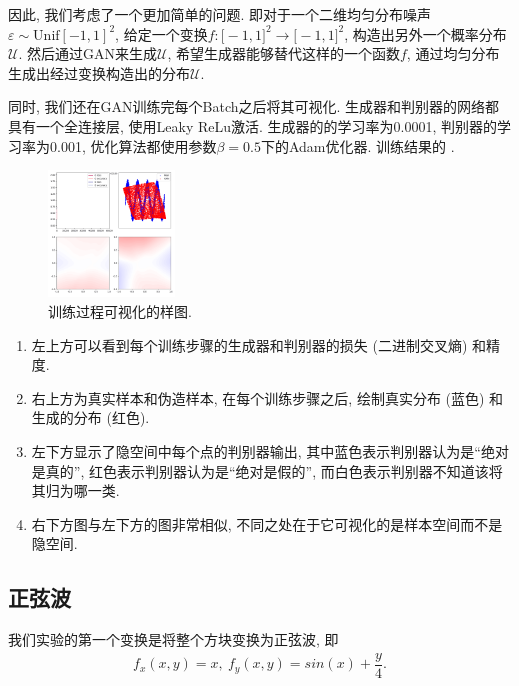 \documentclass[lang=cn,11pt]{elegantpaper}
\begin{document}
因此, 我们考虑了一个更加简单的问题. 即对于一个二维均匀分布噪声$\varepsilon \sim \mathrm{Unif}[-1,1]^2$, 给定一个变换$f:\mathbb [-1,1]^2 \to \mathbb [-1,1]^2$, 构造出另外一个概率分布$\mathcal U$. 然后通过GAN来生成$\mathcal U$, 希望生成器能够替代这样的一个函数$f$, 通过均匀分布生成出经过变换构造出的分布$\mathcal U$.

同时, 我们还在GAN训练完每个Batch之后将其可视化. 生成器和判别器的网络都具有一个全连接层, 使用Leaky ReLu激活. 生成器的的学习率为0.0001, 判别器的学习率为0.001, 优化算法都使用参数$\beta=0.5$下的Adam优化器. 训练结果的 . 
\begin{figure}[htbp]
  \centering
    \includegraphics[width=0.3\textwidth]{sin_2_1}
    \caption{训练过程可视化的样图. \label{fig:f1}}
  \end{figure}

\begin{enumerate}
	\item 左上方可以看到每个训练步骤的生成器和判别器的损失 (二进制交叉熵) 和精度.
	\item 右上方为真实样本和伪造样本, 在每个训练步骤之后, 绘制真实分布 (蓝色) 和生成的分布 (红色).
	\item 左下方显示了隐空间中每个点的判别器输出, 其中蓝色表示判别器认为是“绝对是真的”, 红色表示判别器认为是“绝对是假的”, 而白色表示判别器不知道该将其归为哪一类. 
	\item 右下方图与左下方的图非常相似, 不同之处在于它可视化的是样本空间而不是隐空间. 
\end{enumerate}

\subsection{正弦波}

我们实验的第一个变换是将整个方块变换为正弦波, 即
\begin{align*}
	f_x(x,y)=x,\ f_y(x,y)=sin(x)+\dfrac{y}{4}.
\end{align*}
\end{document}
